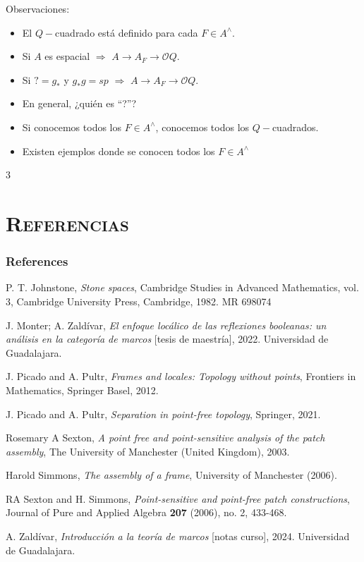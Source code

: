 \documentclass[compress,12pt]{beamer}
\begin{document}
\begin{frame}
\begin{block}{Observaciones:}
\begin{itemize}
	\item<2-> El $Q-$cuadrado está definido para cada $F\in A^\wedge$.
	\item<3-> Si $A$ es espacial $\Rightarrow$ $A\to A_F \to \mathcal{O}Q$.
	\item<4-> Si $?=g_*$ y $g_*g=sp$ $\Rightarrow$ $A\to A_F \to \mathcal{O}Q$.
	\item<5-> En general, ¿quién es ``?''?
	\item<6-> Si conocemos todos los $F\in A^\wedge$, conocemos todos los $Q-$cuadrados.
	\item<7-> Existen ejemplos donde se conocen todos los $F\in A^\wedge$

\end{itemize}
\end{block}
\end{frame}

\begin{frame}
3
\end{frame}

\End

\section*{\textsc{Referencias}}
\begin{frame}[allowframebreaks]
\frametitle{References}
\begin{thebibliography}{20}

 P. T. Johnstone, \textit{Stone spaces}, Cambridge Studies in Advanced Mathematics, vol. 3, Cambridge University Press, Cambridge, 1982. MR 698074


 J. Monter; A. Zaldívar, \textit{El enfoque locálico de las reflexiones booleanas: un análisis en la categoría de marcos} [tesis de maestría], 2022. Universidad de Guadalajara.

 J. Picado and A. Pultr, \textit{Frames and locales: Topology without points}, Frontiers in Mathematics, Springer Basel, 2012.

 J. Picado and A. Pultr, \textit{Separation in point-free topology}, Springer, 2021.

 Rosemary A Sexton, \textit{A point free and point-sensitive analysis of the patch assembly}, The University of Manchester (United Kingdom), 2003.

 Harold Simmons, \textit{The assembly of a frame}, University of Manchester (2006).

 RA Sexton and H. Simmons, \textit{Point-sensitive and point-free patch constructions}, Journal of Pure and Applied Algebra \textbf{207} (2006), no. 2, 433-468.

 A. Zaldívar, \textit{Introducción a la teoría de marcos} [notas curso], 2024. Universidad de Guadalajara.

\end{thebibliography}
\end{frame}
\end{document}
